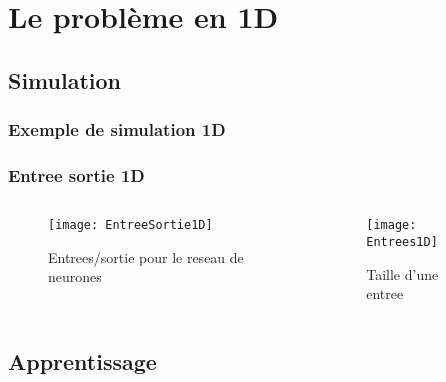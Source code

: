 

% 

\section{Le problème en 1D}

\subsection{Simulation}

\begin{frame}[fragile]
    \frametitle{Exemple de simulation 1D}
  \begin{center}
  \end{center}
\end{frame}

\begin{frame}[fragile]
    \frametitle{Entree sortie 1D}

    \begin{columns}
    \begin{column}{0.7\textwidth}
        \begin{figure}
        \texttt{[image: EntreeSortie1D]}       
        \caption{Entrees/sortie pour le reseau de neurones}
        \end{figure}
     \end{column}
     \begin{column}{0.3\textwidth}
        \begin{figure}
        \texttt{[image: Entrees1D]}       
        \caption{Taille d'une entree}
        \end{figure}
     \end{column}
    \end{columns}

\end{frame}

\subsection{Apprentissage}

